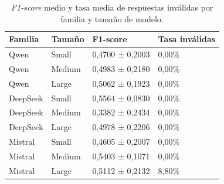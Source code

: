 \begin{table}[htbp]
\centering
\caption[F1-score medio y tasa media de respuestas inválidas por familia y tamaño de modelo]{\textit{F1-score} medio y tasa media de respuestas inválidas por familia y tamaño de modelo.}
\label{tab:f1_familia_tamano}
\begin{tabular}{llll}
\toprule
Familia & Tamaño & F1-score & Tasa inválidas \\
\midrule
Qwen & Small & 0{,}4700 ± 0{,}2003 & 0{,}00\% \\
Qwen & Medium & 0{,}4983 ± 0{,}2180 & 0{,}00\% \\
Qwen & Large & 0{,}5062 ± 0{,}1923 & 0{,}00\% \\
DeepSeek & Small & 0{,}5564 ± 0{,}0830 & 0{,}00\% \\
DeepSeek & Medium & 0{,}3382 ± 0{,}2434 & 0{,}00\% \\
DeepSeek & Large & 0{,}4978 ± 0{,}2206 & 0{,}00\% \\
Mistral & Small & 0{,}4605 ± 0{,}2007 & 0{,}00\% \\
Mistral & Medium & 0{,}5403 ± 0{,}1071 & 0{,}00\% \\
Mistral & Large & 0{,}5112 ± 0{,}2132 & 8{,}80\% \\
\bottomrule
\end{tabular}
\end{table}
